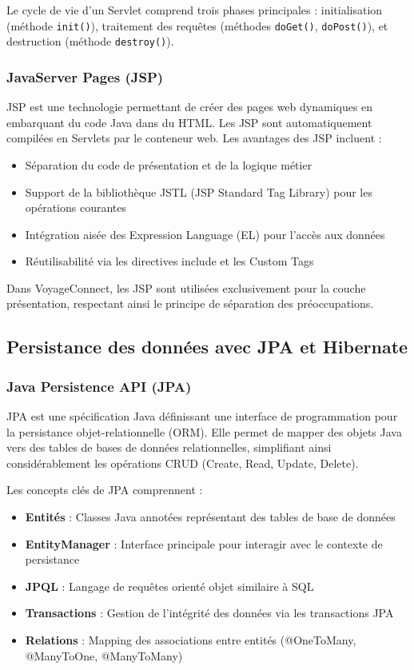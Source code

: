 \documentclass[12pt,a4paper]{report}
\begin{document}
Le cycle de vie d'un Servlet comprend trois phases principales : initialisation (méthode \texttt{init()}), traitement des requêtes (méthodes \texttt{doGet()}, \texttt{doPost()}), et destruction (méthode \texttt{destroy()}).

\subsubsection{JavaServer Pages (JSP)}

JSP est une technologie permettant de créer des pages web dynamiques en embarquant du code Java dans du HTML. Les JSP sont automatiquement compilées en Servlets par le conteneur web. Les avantages des JSP incluent :

\begin{itemize}
    \item Séparation du code de présentation et de la logique métier
    \item Support de la bibliothèque JSTL (JSP Standard Tag Library) pour les opérations courantes
    \item Intégration aisée des Expression Language (EL) pour l'accès aux données
    \item Réutilisabilité via les directives include et les Custom Tags
\end{itemize}

Dans VoyageConnect, les JSP sont utilisées exclusivement pour la couche présentation, respectant ainsi le principe de séparation des préoccupations.

\subsection{Persistance des données avec JPA et Hibernate}

\subsubsection{Java Persistence API (JPA)}

JPA est une spécification Java définissant une interface de programmation pour la persistance objet-relationnelle (ORM). Elle permet de mapper des objets Java vers des tables de bases de données relationnelles, simplifiant ainsi considérablement les opérations CRUD (Create, Read, Update, Delete).

Les concepts clés de JPA comprennent :

\begin{itemize}
    \item \textbf{Entités} : Classes Java annotées représentant des tables de base de données
    \item \textbf{EntityManager} : Interface principale pour interagir avec le contexte de persistance
    \item \textbf{JPQL} : Langage de requêtes orienté objet similaire à SQL
    \item \textbf{Transactions} : Gestion de l'intégrité des données via les transactions JPA
    \item \textbf{Relations} : Mapping des associations entre entités (@OneToMany, @ManyToOne, @ManyToMany)
\end{itemize}
\end{document}
